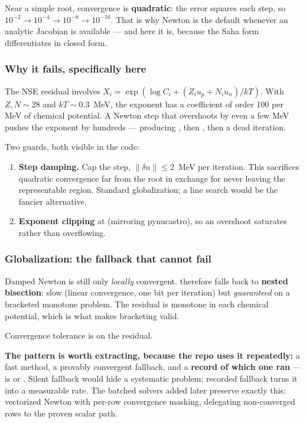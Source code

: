 Near a simple root, convergence is \textbf{quadratic}: the error squares each
step, so $10^{-2} \to 10^{-4} \to 10^{-8} \to 10^{-16}$. That is why Newton is
the default whenever an analytic Jacobian is available --- and here it is,
because the Saha form differentiates in closed form.

\subsubsection{Why it fails, specifically here}
\label{sec:newtonfails}

The NSE residual involves $X_i = \exp(\log C_i + (Z_i u_p + N_i u_n)/kT)$. With
$Z, N \sim 28$ and $kT \sim 0.3$~MeV, the exponent has a coefficient of order
100 per MeV of chemical potential. A Newton step that overshoots by even a few
MeV pushes the exponent by hundreds --- producing , then ,
then a dead iteration.

Two guards, both visible in the code:

\begin{enumerate}
\item \textbf{Step damping.} Cap the step, $\|\delta u\| \leq 2$~MeV per
      iteration. This sacrifices quadratic convergence far from the root in
      exchange for never leaving the representable region. Standard
      globalization; a line search would be the fancier alternative.
\item \textbf{Exponent clipping} at  (mirroring pynucastro), so
      an overshoot saturates rather than overflowing.
\end{enumerate}

\subsubsection{Globalization: the fallback that cannot fail}
\label{sec:globalization}

Damped Newton is still only \emph{locally} convergent. 
therefore falls back to \textbf{nested bisection}: slow (linear convergence, one
bit per iteration) but \emph{guaranteed} on a bracketed monotone problem. The
residual is monotone in each chemical potential, which is what makes bracketing
valid.

Convergence tolerance is  on the residual.

\begin{aside}
\textbf{The pattern is worth extracting, because the repo uses it repeatedly:} a
fast method, a provably convergent fallback, and a \textbf{record of which one
ran} ---  is  or .
Silent fallback would hide a systematic problem; recorded fallback turns it into
a measurable rate. The batched solvers added later preserve exactly this:
vectorized Newton with per-row convergence masking, delegating non-converged
rows to the proven scalar path.
\end{aside}

